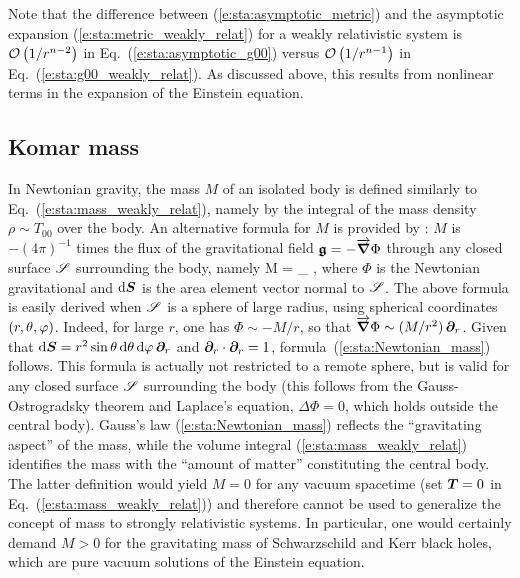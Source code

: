 Note that the difference between (\ref{e:sta:asymptotic_metric})
and the asymptotic expansion (\ref{e:sta:metric_weakly_relat}) for
a weakly relativistic system is
$\mathcal{O}\left( {1}/{r^{n-2}} \right)$ in Eq.~(\ref{e:sta:asymptotic_g00})
versus $\mathcal{O}\left( {1}/{r^{n-1}} \right)$ in Eq.~(\ref{e:sta:g00_weakly_relat}).
As discussed above, this results from nonlinear terms in the expansion of the Einstein equation.


\subsection{Komar mass} \label{s:sta:Komar_mass}

In Newtonian gravity, the mass $M$ of an isolated body is defined
similarly to Eq.~(\ref{e:sta:mass_weakly_relat}), namely by the integral
of the mass density $\rho \sim T_{00}$ over the body. An alternative formula
for $M$ is provided by : $M$ is $-(4\pi)^{-1}$ times the flux of the gravitational field $\bm{\mathfrak{g}} = - \overrightarrow{\bm{\nabla}}\Phi$
through any closed surface $\mathscr{S}$ surrounding the body, namely
\be \label{e:sta:Newtonian_mass}
    M =  \int_{\Sp} \vw{\nabla}{\Phi}\cdot \D {} ,
\ee
where $\Phi$ is the Newtonian gravitational and
$\mathrm{d} \bm{S}$ is the area element vector normal to $\mathscr{S}$. The above formula
is easily derived when $\mathscr{S}$ is a sphere of large radius, using spherical coordinates
$(r,\theta,\varphi)$. Indeed, for large $r$,
one has $\Phi \sim - M/r$, so that $\overrightarrow{\bm{\nabla}}\Phi \sim (M/r^2) \, \bm{\partial}_r$. Given that
$\mathrm{d} \bm{S} = r^2 \sin\theta \, \mathrm{d}\theta\, \mathrm{d}\varphi\, \bm{\partial}_r$ and $\bm{\partial}_r\cdot\bm{\partial}_r = 1$,
formula~(\ref{e:sta:Newtonian_mass}) follows. This formula is
actually not restricted to a remote sphere, but is valid for any closed surface
$\mathscr{S}$ surrounding the body (this follows from the Gauss-Ostrogradsky theorem and Laplace's equation, $\Delta \Phi = 0$, which holds outside the central body).
Gauss's law (\ref{e:sta:Newtonian_mass}) reflects the ``gravitating aspect'' of the mass, while the
volume integral (\ref{e:sta:mass_weakly_relat}) identifies the mass with the ``amount of matter'' constituting
the central body. The latter definition would yield $M=0$ for any vacuum spacetime
(set $\bm{T}=0$ in Eq.~(\ref{e:sta:mass_weakly_relat})) and therefore cannot be used to generalize
the concept of mass to strongly relativistic systems. In  particular, one would certainly
demand $M > 0$ for the gravitating mass of Schwarzschild and Kerr black holes, which are pure vacuum solutions of the Einstein equation.


